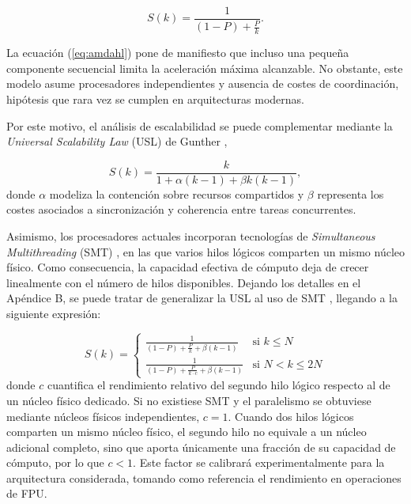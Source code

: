 \documentclass[11pt]{article}
\begin{document}
\begin{equation}
S(k)=
\frac{1}
{(1-P)+\frac{P}{k}}.
\label{eq:amdahl}
\end{equation}

La ecuación (\ref{eq:amdahl}) pone de manifiesto que incluso una pequeña componente secuencial limita la aceleración máxima alcanzable. No obstante, este modelo asume procesadores independientes y ausencia de costes de coordinación, hipótesis que rara vez se cumplen en arquitecturas modernas.

Por este motivo, el análisis de escalabilidad se puede complementar mediante la \emph{Universal Scalability Law} (USL) de Gunther \cite{gunther1993simple},

\begin{equation}
S(k)
=
\frac{k}
{1+\alpha(k-1)+\beta k(k-1)},
\label{eq:usl}
\end{equation}
donde \(\alpha\) modeliza la contención sobre recursos compartidos y \(\beta\) representa los costes asociados a sincronización y coherencia entre tareas concurrentes.

Asimismo, los procesadores actuales incorporan tecnologías de \emph{Simultaneous Multithreading} (SMT) \cite{tullsen1995simultaneous}, en las que varios hilos lógicos comparten un mismo núcleo físico. Como consecuencia, la capacidad efectiva de cómputo deja de crecer linealmente con el número de hilos disponibles. Dejando los detalles en el Apéndice B, se puede tratar de generalizar la USL al uso de SMT \cite{hill2008amdahl}, llegando a la siguiente expresión:

\begin{equation}
S(k) =
\begin{cases}
\frac{1}{(1 - P) + \frac{P}{k} + \beta(k - 1)} & \text{si } k \le N \\[1.5em]
\frac{1}{(1 - P) + \frac{P}{k \cdot c} + \beta(k - 1)} & \text{si } N < k \le 2N
\end{cases}
\label{eq:amdahl_best}
\end{equation}
donde $c$ cuantifica el rendimiento relativo del segundo hilo lógico respecto al de un núcleo físico dedicado. Si no existiese SMT y el paralelismo se obtuviese mediante núcleos físicos independientes, $c=1$. Cuando dos hilos lógicos comparten un mismo núcleo físico, el segundo hilo no equivale a un núcleo adicional completo, sino que aporta únicamente una fracción de su capacidad de cómputo, por lo que $c<1$. Este factor se calibrará experimentalmente para la arquitectura considerada, tomando como referencia el rendimiento en operaciones de FPU.
\end{document}
